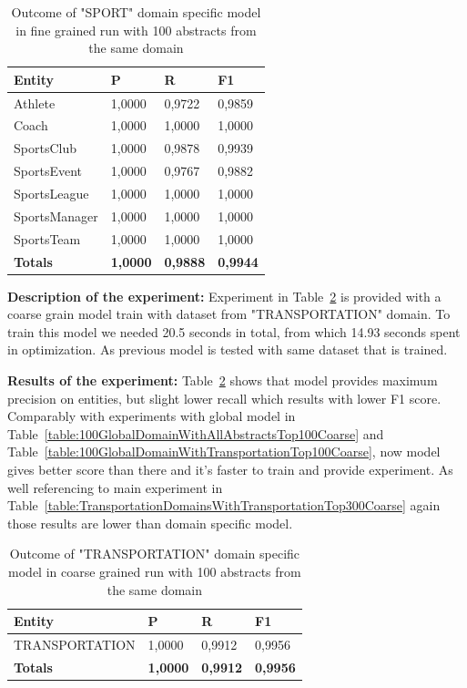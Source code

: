 \documentclass[thesis=M,english]{FITthesis}[2018/05/30]
\begin{document}
	\begin{table}[H]\centering
		\begin{tabular}{|l|l|l|l|}
			\hline {\textbf{Entity}} & {\textbf{P}} & {\textbf{R}} & {\textbf{F1}}\\\hline
				Athlete & 1,0000 & 0,9722 & 0,9859\\
				Coach & 1,0000 & 1,0000 & 1,0000\\
				SportsClub & 1,0000 & 0,9878 & 0,9939\\
				SportsEvent & 1,0000 & 0,9767 & 0,9882\\
				SportsLeague & 1,0000 & 1,0000 & 1,0000\\
				SportsManager & 1,0000 & 1,0000 & 1,0000\\				
				SportsTeam & 1,0000 & 1,0000 & 1,0000\\\hline
				\textbf{Totals} & \textbf{1,0000} & \textbf{0,9888} & \textbf{0,9944}\\\hline
		\end{tabular}
		\caption{Outcome of "SPORT" domain specific model in fine grained run with 100 abstracts from the same domain \label{table:100SportDomainWithSportTop100Fine}}
	\end{table}	

	\textbf{Description of the experiment:} Experiment in Table~\ref{table:100TransportationDomainWithTransportationTop100Coarse} is provided with a coarse grain model train with dataset from "TRANSPORTATION" domain. To train this model we needed 20.5 seconds in total, from which 14.93 seconds spent in optimization. As previous model is tested with same dataset that is trained.

	\textbf{Results of the experiment:} Table~\ref{table:100TransportationDomainWithTransportationTop100Coarse} shows that model provides maximum precision on entities, but slight lower recall which results with lower F1 score. Comparably with experiments with global model in Table~\ref{table:100GlobalDomainWithAllAbstractsTop100Coarse} and Table~\ref{table:100GlobalDomainWithTransportationTop100Coarse}, now model gives better score than there and it's faster to train and provide experiment. As well referencing to main experiment in Table~\ref{table:TransportationDomainsWithTransportationTop300Coarse} again those results are lower than domain specific model. 

	\begin{table}[H]\centering
		\begin{tabular}{|l|l|l|l|}
			\hline {\textbf{Entity}} & {\textbf{P}} & {\textbf{R}} & {\textbf{F1}}\\\hline
				TRANSPORTATION & 1,0000 & 0,9912 & 0,9956\\\hline
				\textbf{Totals} & \textbf{1,0000} & \textbf{0,9912} & \textbf{0,9956}\\\hline
		\end{tabular}
		\caption{Outcome of "TRANSPORTATION" domain specific model in coarse grained run with 100 abstracts from the same domain \label{table:100TransportationDomainWithTransportationTop100Coarse}}
	\end{table}
	
\end{document}
